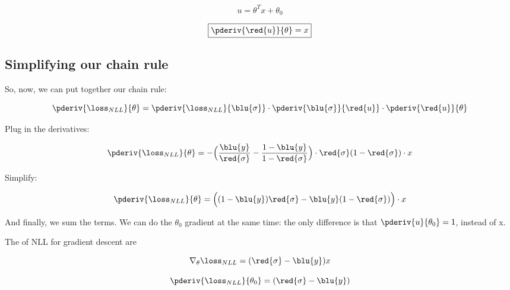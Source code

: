         \begin{equation}
            u = \theta^Tx+\theta_0
        \end{equation}
        
        \begin{equation}
        \boxed{
            \pderiv{\red{u}}{\theta} = x
        }
        \end{equation}
        
    \subsection{Simplifying our chain rule}
    
        So, now, we can put together our chain rule:
        
        \begin{equation}
            \pderiv{ \loss_{NLL} }{ \theta } 
            = 
            \pderiv{ \loss_{NLL} }{ \blu{\sigma} } 
            \cdot 
            \pderiv{ \blu{\sigma} }{\red{u}} 
            \cdot 
            \pderiv{\red{u}}{\theta}
        \end{equation}
        
        Plug in the derivatives:
        
        \begin{equation}
            \pderiv{ \loss_{NLL} }{ \theta } 
            = 
            -
            \Big(
                \frac{ \blu{y} } { \red{\sigma} } 
                -
                \frac{ 1-\blu{y} } { 1 - \red{\sigma} }
            \Big)
            \cdot
            \red{\sigma} (1-\red{\sigma})
            \cdot 
            x
        \end{equation}
        
        Simplify:
        
        \begin{equation}
            \pderiv{ \loss_{NLL} }{ \theta } 
            = 
            \Big(
                (1-\blu{y})\red{\sigma} 
                -
                \blu{y}(1-\red{\sigma})
            \Big)
            \cdot 
            x
        \end{equation}
        
        And finally, we sum the terms. We can do the $\theta_0$ gradient at the same time: the only difference is that $\pderiv{u}{\theta_0}=1$, instead of x.\\
        
        \begin{kequation}
            The  of NLL for gradient descent are
            
            \begin{equation*}
                \nabla_\theta \loss_{NLL} 
                =
                (\red{\sigma} - \blu{y})x
            \end{equation*}
            
            \begin{equation*}
                \pderiv{\loss_{NLL}}{\theta_0}
                =
                (\red{\sigma} - \blu{y})
            \end{equation*}
        \end{kequation}
        
